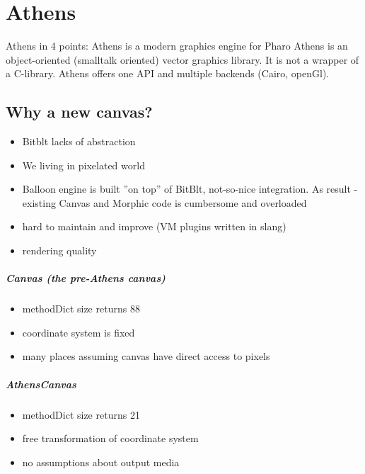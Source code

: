 \documentclass[a4paper,10pt,twoside]{book}
\begin{document}
\fi
\sloppy
\chapter{Athens}

Athens in 4 points:  Athens is a modern graphics engine for Pharo
Athens is an object-oriented (smalltalk oriented) vector graphics library. It is not a
wrapper of a C-library. 
Athens offers one API and multiple backends (Cairo, openGl).


\section{Why a new canvas?}

\begin{itemize}
\item Bitblt lacks of abstraction
\item We living in pixelated world
\item Balloon engine is built ''on top'' of BitBlt, not-so-nice integration. As result - existing Canvas and Morphic code is cumbersome and overloaded
\item hard to maintain and improve (VM plugins written in slang)
\item rendering quality
\end{itemize}

\paragraph{Canvas (the pre-Athens canvas)}
\begin{itemize}
\item  methodDict size returns 88
\item coordinate system is fixed
\item  many places assuming canvas have direct access to pixels
\end{itemize}

\paragraph{AthensCanvas}
\begin{itemize}
\item  methodDict size returns 21
\item free transformation of coordinate system 
\item  no assumptions about output media
\end{itemize}
\end{document}
